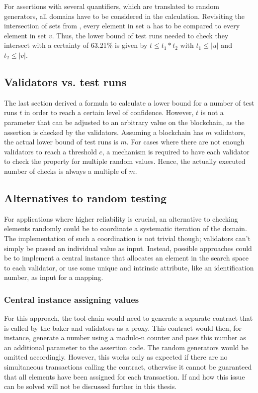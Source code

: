 For assertions with several quantifiers, which are translated to random generators, all domains have to be considered in the calculation. Revisiting the intersection of sets from , every element in set $u$ has to be compared to every element in set $v$. Thus, the lower bound of test runs needed to check they intersect with a certainty of 63.21\% is given by $t \leq t_1 * t_2$ with $t_1 \leq |u|$ and $t_2 \leq |v|$.

\subsection{Validators vs. test runs}
The last section derived a formula to calculate a lower bound for a number of test runs $t$ in order to reach a certain level of confidence. However, $t$ is not a parameter that can be adjusted to an arbitrary value on the blockchain, as the assertion is checked by the validators. Assuming a blockchain has $m$ validators, the actual lower bound of test runs is $m$. For cases where there are not enough validators to reach a threshold $c$, a mechanism is required to have each validator to check the property for multiple random values. Hence, the actually executed number of checks is always a multiple of $m$. 

\subsection{Alternatives to random testing}
For applications where higher reliability is crucial, an alternative to checking elements randomly could be to coordinate a systematic iteration of the domain. The implementation of such a coordination is not trivial though; validators can't simply be passed an individual value as input. Instead, possible approaches could be to implement a central instance that allocates an element in the search space to each validator, or use some unique and intrinsic attribute, like an identification number, as input for a mapping.

\subsubsection{Central instance assigning values}
For this approach, the tool-chain would need to generate a separate contract that is called by the baker and validators as a proxy. This contract would then, for instance, generate a number using a modulo-n counter and pass this number as an additional parameter to the assertion code. The random generators would be omitted accordingly. However, this works only as expected if there are no simultaneous transactions calling the contract, otherwise it cannot be guaranteed that all elements have been assigned for each transaction. If and how this issue can be solved will not be discussed further in this thesis.

